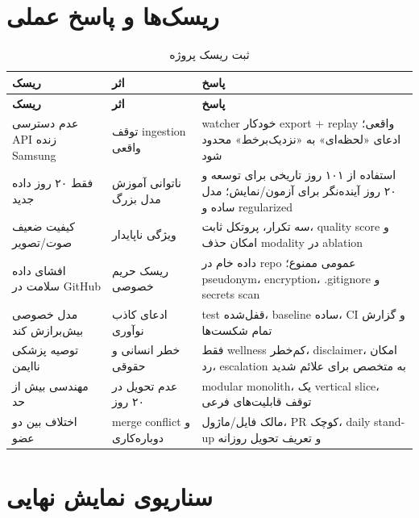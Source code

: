 \documentclass[11pt,a4paper]{article}
\begin{document}
\section{ریسک‌ها و پاسخ عملی}

\begin{longtable}{p{}p{}p{}}
\caption{ثبت ریسک پروژه}\label{tab:risks}\\
\toprule
\textbf{ریسک} & \textbf{اثر} & \textbf{پاسخ}\\
\midrule
\endfirsthead
\toprule
\textbf{ریسک} & \textbf{اثر} & \textbf{پاسخ}\\
\midrule
\endhead
عدم دسترسی API زنده Samsung & توقف ingestion واقعی & watcher خودکار export + replay واقعی؛ ادعای «لحظه‌ای» به «نزدیک‌برخط» محدود شود\\
فقط ۲۰ روز داده جدید & ناتوانی آموزش مدل بزرگ & استفاده از ۱۰۱ روز تاریخی برای توسعه و ۲۰ روز آینده‌نگر برای آزمون/نمایش؛ مدل ساده و regularized\\
کیفیت ضعیف صوت/تصویر & ویژگی ناپایدار & سه تکرار، پروتکل ثابت، quality score و امکان حذف modality در ablation\\
افشای داده سلامت در GitHub & ریسک حریم خصوصی & داده خام در repo عمومی ممنوع؛ pseudonym، encryption، .gitignore و secrets scan\\
مدل خصوصی بیش‌برازش کند & ادعای کاذب نوآوری & test قفل‌شده، baseline ساده، CI و گزارش تمام شکست‌ها\\
توصیه پزشکی ناایمن & خطر انسانی و حقوقی & فقط wellness کم‌خطر، disclaimer، امکان رد، escalation به متخصص برای علائم شدید\\
مهندسی بیش از حد & عدم تحویل در ۲۰ روز & modular monolith، یک vertical slice، توقف قابلیت‌های فرعی\\
اختلاف بین دو عضو & merge conflict و دوباره‌کاری & مالک فایل/ماژول، PR کوچک، daily stand-up و تعریف تحویل روزانه\\
\bottomrule
\end{longtable}

\section{سناریوی نمایش نهایی}
\end{document}
